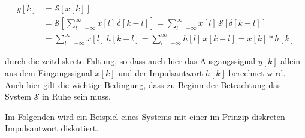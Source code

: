 \begin{align*}
y[k] &= \mathcal{S}\left[x[k]\right] \\
&= \mathcal{S}\!\left[\sum_{l=-\infty}^{\infty} x[l]\,\delta[k-l]\right] = \sum_{l=-\infty}^{\infty} x[l]\,\mathcal{S}\!\left[\delta[k-l]\right] \\
&= \sum_{l=-\infty}^{\infty} x[l]\,h[k-l] = \sum_{l=-\infty}^{\infty} h[l]\,x[k-l] = x[k] * h[k]
\end{align*}

durch die zeitdiskrete Faltung, so dass auch hier das Ausgangssignal $y[k]$ allein aus dem Eingangssignal $x[k]$ und der Impulsantwort $h[k]$ berechnet wird. Auch hier gilt die wichtige Bedingung, dass zu Beginn der Betrachtung das System $\mathcal{S}$ in Ruhe sein muss.

Im Folgenden wird ein Beispiel eines Systems mit einer im Prinzip diskreten Impulsantwort diskutiert.

